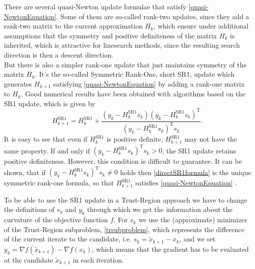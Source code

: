 There are several quasi-Newton update formulae that satisfy \cref{quasi-NewtonEquation}. Some of them are so-called rank-two updates, since they add a rank-two matrix to the current approximation $H_k$, which ensure under additional assumptions that the symmetry and positive definiteness of the matrix $H_k$ is inherited, which is attractive for linesearch methods, since the resulting search direction is then a descent direction. \\
But there is also a simpler rank-one update that just maintains symmetry of the matrix $H_k$. It's the so-called Symmetric Rank-One, short SR1, update which generates $H_{k+1}$ satisfying \cref{quasi-NewtonEquation} by adding a rank-one matrix to $H_k$. Good numerical results have been obtained with algorithms based on the SR1 update, which is given by
\begin{equation}\label{directSR1formula}
    H^\mathrm{SR1}_{k+1} = H^\mathrm{SR1}_k + \frac{(y_k - H^\mathrm{SR1}_k s_k) (y_k - H^\mathrm{SR1}_k s_k)^{\mathrm{T}}}{(y_k - H^\mathrm{SR1}_k s_k)^{\mathrm{T}} s_k}.
\end{equation}
It is easy to see that even if $H^\mathrm{SR1}_k$ is positive definite, $H^\mathrm{SR1}_{k+1}$ may not have the same property. If and only if $(y_k - H^\mathrm{SR1}_k s_k)^{\mathrm{T}} s_k > 0$, the SR1 update retains positive definiteness. However, this condition is difficult to guarantee. It can be shown, that if $(y_k - H^\mathrm{SR1}_k s_k)^{\mathrm{T}} s_k \neq 0$ holds then \cref{directSR1formula} is the unique symmetric rank-one formula, so that $H^\mathrm{SR1}_{k+1}$ satisfies \cref{quasi-NewtonEquation} \cite[p.~144-145]{NocedalWright:2006}. \\

\newpage

To be able to use the SR1 update in a Trust-Region approach we have to change the definitions of $s_k$ and $y_k$ through which we get the information about the curvature of the objective function $f$. For $s_k$ we use the (approximate) minimizer of the Trust-Region subproblem, \cref{trsubproblem}, which represents the difference of the current iterate to the candidate, i.e. $s_k = \widetilde{x}_{k+1} - x_k$, and we set $y_k = \nabla f(\widetilde{x}_{k+1}) - \nabla f(x_k)$, which means that the gradient has to be evaluated at the candidate $\widetilde{x}_{k+1}$ in each iteration. \\

